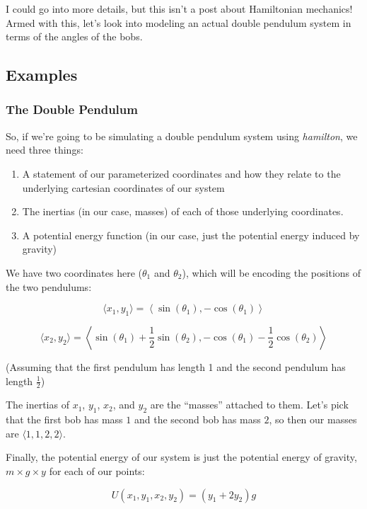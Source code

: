 \documentclass[]{article}
\begin{document}
I could go into more details, but this isn't a post about Hamiltonian mechanics!
Armed with this, let's look into modeling an actual double pendulum system in
terms of the angles of the bobs.

\subsection{Examples}\label{examples}

\subsubsection{The Double Pendulum}\label{the-double-pendulum}

So, if we're going to be simulating a double pendulum system using
\emph{hamilton}, we need three things:

\begin{enumerate}
\def\labelenumi{\arabic{enumi}.}
\item
  A statement of our parameterized coordinates and how they relate to the
  underlying cartesian coordinates of our system
\item
  The inertias (in our case, masses) of each of those underlying coordinates.
\item
  A potential energy function (in our case, just the potential energy induced by
  gravity)
\end{enumerate}

We have two coordinates here (\(\theta_1\) and \(\theta_2\)), which will be
encoding the positions of the two pendulums:

\[
\langle x_1, y_1 \rangle =
  \left\langle \sin (\theta_1), - \cos (\theta_1) \right\rangle
\]

\[
\langle x_2, y_2 \rangle =
  \left\langle \sin (\theta_1) + \frac{1}{2} \sin (\theta_2),
    - \cos (\theta_1) - \frac{1}{2} \cos (\theta_2) \right\rangle
\]

(Assuming that the first pendulum has length 1 and the second pendulum has
length \(\frac{1}{2}\))

The inertias of \(x_1\), \(y_1\), \(x_2\), and \(y_2\) are the ``masses''
attached to them. Let's pick that the first bob has mass \(1\) and the second
bob has mass \(2\), so then our masses are \(\langle 1, 1, 2, 2 \rangle\).

Finally, the potential energy of our system is just the potential energy of
gravity, \(m \times g \times y\) for each of our points:

\[
U(x_1, y_1, x_2, y_2) = ( y_1 + 2 y_2 ) g
\]
\end{document}
